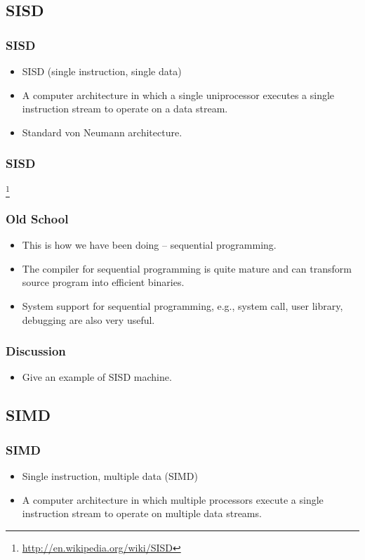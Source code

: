 \documentclass{beamer}
\begin{document}
\begin{CJK}{UTF8}{bsmi}
\subsection{SISD}

\begin{frame}
\frametitle{SISD}
\begin{itemize}
\item SISD (single instruction, single data) 
\item A computer architecture in which a single uniprocessor executes
  a single instruction stream to operate on a data stream.
\item Standard von Neumann architecture.
\end{itemize}
\end{frame}

\begin{frame}
\frametitle{SISD}
\centerline{}
\footnote{\url{http://en.wikipedia.org/wiki/SISD}}
\end{frame}

\begin{frame}
\frametitle{Old School}
\begin{itemize}
\item This is how we have been doing -- sequential programming.
\item The compiler for sequential programming is quite mature and can
  transform source program into efficient binaries.
\item System support for sequential programming, e.g., system call,
  user library, debugging are also very useful.
\end{itemize}
\end{frame}

\begin{frame}
\frametitle{Discussion}
\begin{itemize}
\item Give an example of SISD machine.
\end{itemize}
\end{frame}

\subsection{SIMD}

\begin{frame}
\frametitle{SIMD}
\begin{itemize}
\item Single instruction, multiple data (SIMD) 
\item A computer architecture in which multiple processors execute a
  single instruction stream to operate on multiple data streams.
\end{itemize}
\end{frame}


\end{CJK}
\end{document}
